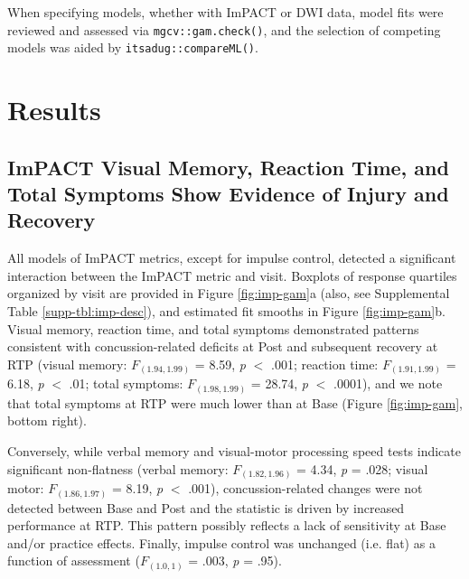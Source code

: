 \documentclass[12pt]{article}
\begin{document}
When specifying models, whether with ImPACT or DWI data, model fits were reviewed and assessed via \lstinline{mgcv::gam.check()}, and the selection of competing models was aided by \lstinline{itsadug::compareML()}.


\section{Results}
\label{sec:res}

\subsection{ImPACT Visual Memory, Reaction Time, and Total Symptoms Show Evidence of Injury and Recovery}
\label{ssec:res-imp}
All models of ImPACT metrics, except for impulse control, detected a significant interaction between the ImPACT metric and visit. Boxplots of response quartiles organized by visit are provided in Figure \ref{fig:imp-gam}a (also, see Supplemental Table \ref{supp-tbl:imp-desc}), and estimated fit smooths in Figure \ref{fig:imp-gam}b. Visual memory, reaction time, and total symptoms demonstrated patterns consistent with concussion-related deficits at Post and subsequent recovery at RTP (visual memory: $F_{(1.94, 1.99)}$ = 8.59, \textit{p} $<$ .001; reaction time: $F_{(1.91, 1.99)}$ = 6.18, \textit{p} $<$ .01; total symptoms: $F_{(1.98, 1.99)}$ = 28.74, \textit{p} $<$ .0001), and we note that total symptoms at RTP were much lower than at Base (Figure \ref{fig:imp-gam}, bottom right).

Conversely, while verbal memory and visual-motor processing speed tests indicate significant non-flatness (verbal memory: $F_{(1.82, 1.96)}$ = 4.34, \textit{p} = .028; visual motor: $F_{(1.86, 1.97)}$ = 8.19, \textit{p} $<$ .001), concussion-related changes were not detected between Base and Post and the statistic is driven by increased performance at RTP. This pattern possibly reflects a lack of sensitivity at Base and/or practice effects. Finally, impulse control was unchanged (i.e. flat) as a function of assessment ($F_{(1.0, 1)}$ = .003, \textit{p} = .95).
\end{document}
